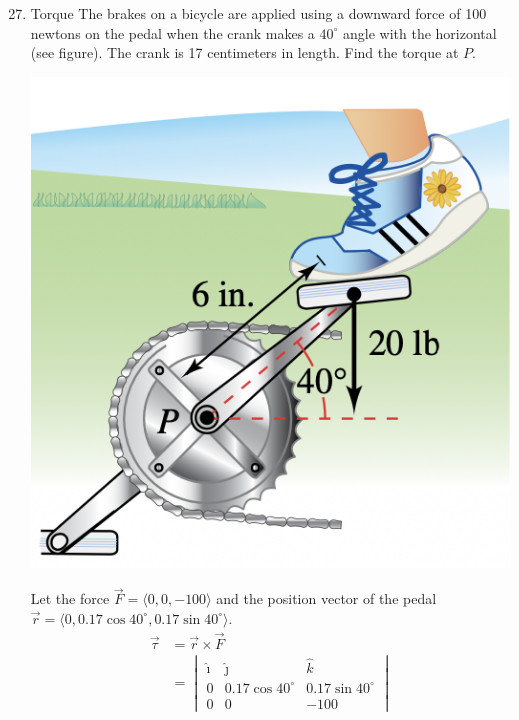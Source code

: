 \begin{enumerate}
          \setcounter{enumi}{26}
    \item Torque The brakes on a bicycle are applied using a downward force of 100
          newtons on the pedal when the crank makes a $40^{\circ}$ angle with the
          horizontal (see figure). The crank is 17 centimeters in length. Find the torque
          at $P$.
          \begin{center}
              \includegraphics[scale=0.55]{assets/larson11.4q27.png}
          \end{center}
          \newpage
          \sol{} Let the force $\vec{F} = \langle 0, 0, -100 \rangle$ and the position vector of the pedal $\vec{r} = \langle 0, 0.17\cos40^{\circ}, 0.17\sin40^{\circ} \rangle$.
          \begin{align*}
              \vec{\tau}        & = \vec{r} \times \vec{F}                                                                   \\
                                & = \begin{vmatrix}
                                        \hat{\imath} & \hat{\jmath}       & \hat{k}            \\
                                        0            & 0.17\cos40^{\circ} & 0.17\sin40^{\circ} \\
                                        0            & 0                  & -100

\end{vmatrix}
\end{align*}
\end{enumerate}
